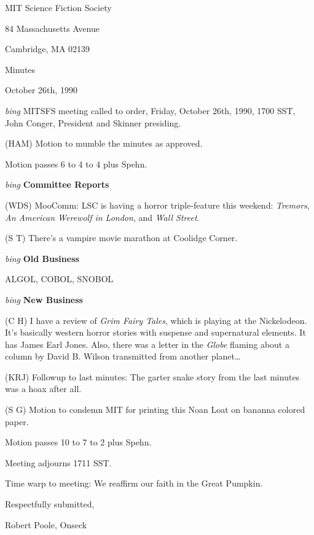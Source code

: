 \setlength{\topmargin}{-0.5in}
\setlength{\oddsidemargin}{0.0in}
\setlength{\evensidemargin}{0.0in}
\setlength{\textheight}{9in}
\setlength{\textwidth}{6.5in}



\begin{center}
MIT Science Fiction Society

84 Massachusetts Avenue

Cambridge, MA 02139

\vspace{0.2in}
Minutes

October 26th, 1990

\end{center}
 
\vspace{0.15in}
{\em bing\/}  MITSFS meeting called to order, Friday, October 26th, 1990,
1700 SST, John Conger, President and Skinner presiding.

(HAM) Motion to mumble the minutes as approved.

Motion passes 6 to 4 to 4 plus Spehn.

\vspace{0.15in}
{\em bing\/} {\bf Committee Reports\/}

(WDS) MooComm: LSC is having a horror triple-feature this weekend:
{\em Tremors\/}, {\em An American Werewolf in London\/}, and
{\em Wall Street\/}.

(S T) There's a vampire movie marathon at Coolidge Corner.

\vspace{.15in}
{\em bing\/} {\bf Old Business\/}

ALGOL, COBOL, SNOBOL

\vspace{0.15in}
{\em bing\/} {\bf New Business\/}

(C H) I have a review of {\em Grim Fairy Tales\/}, which is playing at the
Nickelodeon.  It's basically western horror stories with suspense and
supernatural elements.  It has James Earl Jones.
Also, there was a letter in the {\em Globe\/} flaming about a column by David
B. Wilson transmitted from another planet\ldots

(KRJ) Followup to last minutes: The garter snake story from the last minutes
was a hoax after all.

(S G) Motion to condemn MIT for printing this Noan Loat on bananna colored
paper.

Motion passes 10 to 7 to 2 plus Spehn.

Meeting adjourns 1711 SST.

Time warp to meeting: We reaffirm our faith in the Great Pumpkin.

\vspace{0.15in}
\begin{center}
Respectfully submitted,

Robert Poole, Onseck
\end{center}

